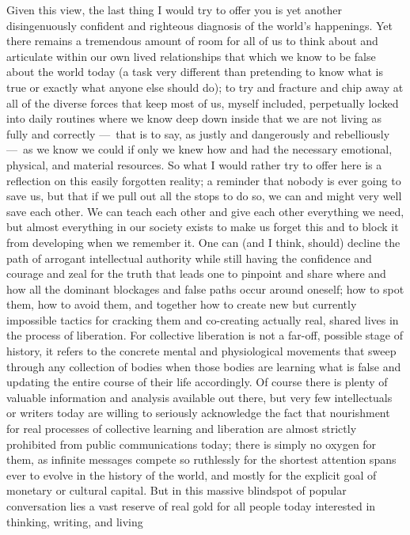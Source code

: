 \documentclass[a4paper,12pt,margin=.5in]{article}
\begin{document}
Given this view, the last thing I would try to offer you is yet another
disingenuously confident and righteous diagnosis of the world's
happenings. Yet there remains a tremendous amount of room for all of us
to think about and articulate within our own lived relationships that
which we know to be false about the world today (a task very different
than pretending to know what is true or exactly what anyone else should
do); to try and fracture and chip away at all of the diverse forces that
keep most of us, myself included, perpetually locked into daily routines
where we know deep down inside that we are not living as fully and
correctly ---~that is to say, as justly and dangerously and rebelliously
---~as we know we could if only we knew how and had the necessary
emotional, physical, and material resources. So what I would rather try
to offer here is a reflection on this easily forgotten reality; a
reminder that nobody is ever going to save us, but that if we pull out
all the stops to do so, we can and might very well save each other. We
can teach each other and give each other everything we need, but almost
everything in our society exists to make us forget this and to block it
from developing when we remember it. One can (and I think, should)
decline the path of arrogant intellectual authority while still having
the confidence and courage and zeal for the truth that leads one to
pinpoint and share where and how all the dominant blockages and false
paths occur around oneself; how to spot them, how to avoid them, and
together how to create new but currently impossible tactics for cracking
them and co-creating actually real, shared lives in the process of
liberation. For collective liberation is not a far-off, possible stage
of history, it refers to the concrete mental and physiological movements
that sweep through any collection of bodies when those bodies are
learning what is false and updating the entire course of their life
accordingly. Of course there is plenty of valuable information and
analysis available out there, but very few intellectuals or writers
today are willing to seriously acknowledge the fact that nourishment for
real processes of collective learning and liberation are almost strictly
prohibited from public communications today; there is simply no oxygen
for them, as infinite messages compete so ruthlessly for the shortest
attention spans ever to evolve in the history of the world, and mostly
for the explicit goal of monetary or cultural capital. But in this
massive blindspot of popular conversation lies a vast reserve of real
gold for all people today interested in thinking, writing, and living
\end{document}
